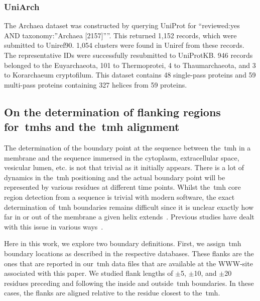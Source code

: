 \subsubsection{UniArch}
The Archaea dataset was constructed by querying UniProt for ``reviewed:yes AND taxonomy:''Archaea [2157]''''.
This returned 1,152 records, which were submitted to Uniref90.
1,054 clusters were found in Uniref from these records.
The representative IDs were successfully resubmitted to UniProtKB.
946 records belonged to the Euyarchaeota, 101 to Thermoprotei, 4 to Thaumarchaeota, and 3 to Korarchaeum cryptofilum.
This dataset contains 48 single-pass proteins and 59 multi-pass proteins containing 327 helices from 59 proteins.


\subsection{On the determination of flanking regions for~\gls{tmh}s and the~\gls{tmh} alignment}

The determination of the boundary point at the sequence between the~\gls{tmh} in a membrane and the sequence immersed in the cytoplasm, extracellular space, vesicular lumen, etc.
is not that trivial as it initially appears.
There is a lot of dynamics in the~\gls{tmh} positioning and the actual boundary point will be represented by various residues at different time points.
Whilst the~\gls{tmh} core region detection from a sequence is trivial with modern software, the exact determination of~\gls{tmh} boundaries remains difficult since it is unclear exactly how far in or out of the membrane a given helix extends~\cite{Ojemalm2013}.
Previous studies have dealt with this issue in various ways~\cite{Sharpe2010,Baeza-Delgado2013,Pogozheva2013, White2008}.

Here in this work, we explore two boundary definitions.
First, we assign~\gls{tmh} boundary locations as described in the respective databases.
These flanks are the ones that are reported in our~\gls{tmh} data files that are available at the WWW-site associated with this paper.
We studied flank lengths of $\pm$5, $\pm$10, and $\pm$20 residues preceding and following the inside and outside~\gls{tmh} boundaries.
In these cases, the flanks are aligned relative to the residue closest to the~\gls{tmh}.

